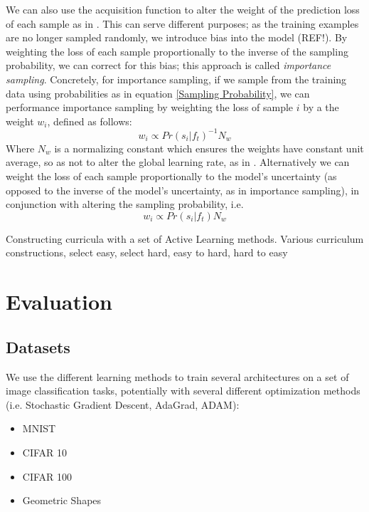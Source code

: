 \documentclass[a4paper,10.5pt]{article}
\begin{document}
We can also use the acquisition function to alter the weight of the prediction loss of each sample as in \cite{Chang 18}. This can serve different purposes; as the training examples are no longer sampled randomly, we introduce bias into the model (REF!). By weighting the loss of each sample proportionally to the inverse of the sampling probability, we can correct for this bias; this approach is called \textit{importance sampling}. Concretely, for importance sampling, if we sample from the training data using probabilities as in equation \ref{Sampling Probability}, we can performance importance sampling by weighting the loss of sample $i$ by a the weight $w_i$, defined as follows:
\begin{equation}
w_i \propto Pr(s_i|f_t)^{-1} N_w
\end{equation}
Where $N_w$ is a normalizing constant which ensures the weights have constant unit average, so as not to alter the global learning rate, as in \cite{Chang 18}.
Alternatively we can weight the loss of each sample proportionally to the model's uncertainty (as opposed to the inverse of the model's uncertainty, as in importance sampling), in conjunction with altering the sampling probability, i.e.
\begin{equation}
w_i \propto Pr(s_i|f_t) N_w
\end{equation}


Constructing curricula with a set of Active Learning methods. 
Various curriculum constructions, select easy, select hard, easy to hard, hard to easy

\section{Evaluation}
\subsection*{Datasets}
We use the different learning methods to train several architectures on a set of image classification tasks, potentially with several different optimization methods (i.e. Stochastic Gradient Descent, AdaGrad, ADAM):
\begin{itemize}
	\item MNIST
	\item CIFAR 10
	\item CIFAR 100
	\item Geometric Shapes
\end{itemize}
\end{document}
